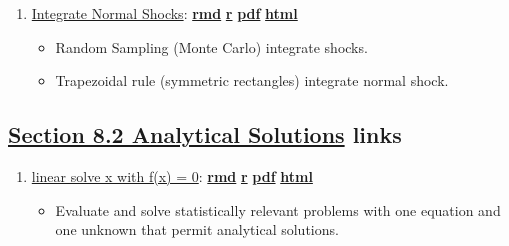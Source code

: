 \documentclass[
]{book}
\providecommand{\tightlist}{%
  \setlength{\itemsep}{0pt}\setlength{\parskip}{0pt}}
\begin{document}
\begin{enumerate}
\def\labelenumi{\arabic{enumi}.}
\tightlist
\item
  \href{https://fanwangecon.github.io/R4Econ/math/integration/htmlpdfr/fs_integrate_normal.html}{Integrate Normal Shocks}: \href{https://github.com/FanWangEcon/R4Econ/blob/master/math/integration//fs_integrate_normal.Rmd}{\textbf{rmd}} \textbar{} \href{https://github.com/FanWangEcon/R4Econ/blob/master/math/integration/htmlpdfr/fs_integrate_normal.R}{\textbf{r}} \textbar{} \href{https://github.com/FanWangEcon/R4Econ/blob/master/math/integration/htmlpdfr/fs_integrate_normal.pdf}{\textbf{pdf}} \textbar{} \href{https://fanwangecon.github.io/R4Econ/math/integration/htmlpdfr/fs_integrate_normal.html}{\textbf{html}}

  \begin{itemize}
  \tightlist
  \item
    Random Sampling (Monte Carlo) integrate shocks.
  \item
    Trapezoidal rule (symmetric rectangles) integrate normal shock.
  \end{itemize}
\end{enumerate}

\hypertarget{section-8.2-analytical-solutionsanalytical-solutions-links}{%
\subsection{\texorpdfstring{\protect\hyperlink{analytical-solutions}{Section 8.2 Analytical Solutions} links}{Section 8.2 Analytical Solutions links}}\label{section-8.2-analytical-solutionsanalytical-solutions-links}}

\begin{enumerate}
\def\labelenumi{\arabic{enumi}.}
\tightlist
\item
  \href{https://fanwangecon.github.io/R4Econ/math/solutions/htmlpdfr/fs_solu_x_lin.html}{linear solve x with f(x) = 0}: \href{https://github.com/FanWangEcon/R4Econ/blob/master/math/solutions//fs_solu_x_lin.Rmd}{\textbf{rmd}} \textbar{} \href{https://github.com/FanWangEcon/R4Econ/blob/master/math/solutions/htmlpdfr/fs_solu_x_lin.R}{\textbf{r}} \textbar{} \href{https://github.com/FanWangEcon/R4Econ/blob/master/math/solutions/htmlpdfr/fs_solu_x_lin.pdf}{\textbf{pdf}} \textbar{} \href{https://fanwangecon.github.io/R4Econ/math/solutions/htmlpdfr/fs_solu_x_lin.html}{\textbf{html}}

  \begin{itemize}
  \tightlist
  \item
    Evaluate and solve statistically relevant problems with one equation and one unknown that permit analytical solutions.
  \end{itemize}
\end{enumerate}
\end{document}

